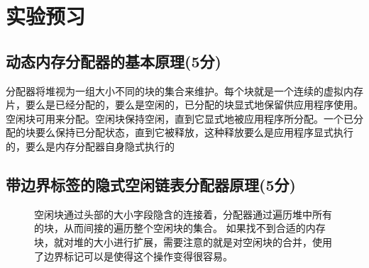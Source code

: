 \section{实验预习}
\subsection{动态内存分配器的基本原理(5分)}
分配器将堆视为一组大小不同的块的集合来维护。每个块就是一个连续的虚拟内存片，要么是已经分配的，要么是空闲的，已分配的块显式地保留供应用程序使用。空闲块可用来分配。空闲块保持空闲，直到它显式地被应用程序所分配。一个已分配的块要么保持已分配状态，直到它被释放，这种释放要么是应用程序显式执行的，要么是内存分配器自身隐式执行的

\subsection{带边界标签的隐式空闲链表分配器原理(5分)}

\begin{figure}[H]
    \begin{minipage}[l]{0.6\linewidth}
        \heiti
    \end{minipage}
    \begin{minipage}[c]{0.4\linewidth}
        \heiti
        空闲块通过头部的大小字段隐含的连接着，分配器通过遍历堆中所有的块，从而间接的遍历整个空闲块的集合。
        如果找不到合适的内存块，就对堆的大小进行扩展，需要注意的就是对空闲块的合并，使用了边界标记可以是使得这个操作变得很容易。
    \end{minipage}
\end{figure}


